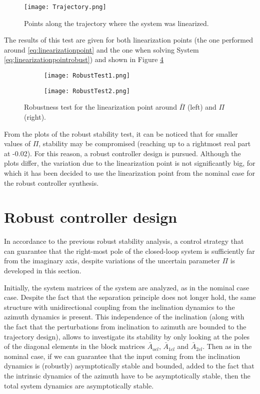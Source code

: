 \documentclass[../main.tex]{subfiles}
\begin{document}
 \begin{figure}[H]\centering
 	\texttt{[image: Trajectory.png]}
 	\caption{Points along the trajectory where the system was linearized.
 		\label{fig:Trajectory} }
 \end{figure}
 
 The results of this test are given for both linearization points (the one performed around \eqref{eq:linearizationpoint} and the one when solving System \eqref{eq:linearizationpointrobust}) and shown in Figure \ref{fig:RobustTest}
 
 \begin{figure}[ht]
 	\centering
 	\begin{subfigure}[b]{0.45\textwidth}
 		\texttt{[image: RobustTest1.png]}
 		\label{fig:RobustTest1}
 	\end{subfigure}
 	\begin{subfigure}[b]{0.45\textwidth}
 		\texttt{[image: RobustTest2.png]}
 		\label{fig:RobustTest2}
 	\end{subfigure}
 	\caption{\label{fig:RobustTest}Robustness test for the linearization point around $\bar{\Pi}$ (left) and $\Pi$ (right).}
 \end{figure} 
 
 From the plots of the robust stability test, it can be noticed that for smaller values of $\Pi$, stability may be compromised (reaching up to a rightmost real part at -0.02). For this reason, a robust controller design is pursued. Although the plots differ, the variation due to the linearization point is not significantly big, for which it has been decided to use the linearization point from the nominal case for the robust controller synthesis.
\newpage 
\section{Robust controller design}

In accordance to the previous robust stability analysis, a control strategy that can guarantee that the right-most pole of the closed-loop system is sufficiently far from the imaginary axis, despite variations of the uncertain parameter $\Pi$ is developed in this section.

Initially, the system matrices of the system are analyzed, as in the nominal case case. Despite the fact that the separation principle does not longer hold, the same structure with unidirectional coupling from the inclination dynamics to the azimuth dynamics is present. This independence of the inclination (along with the fact that the perturbations from inclination to azimuth are bounded to the trajectory design), allows to investigate its stability by only looking at the poles of the diagonal elements in the block matrices $\bar{A}_{ocl}$, $\bar{A}_{1cl}$ and $\bar{A}_{2cl}$. Then as in the nominal case, if we can guarantee that the input coming from the inclination dynamics is (robustly) asymptotically stable and bounded, added to the fact that the intrinsic dynamics of the azimuth have to be asymptotically stable, then the total system dynamics are asymptotically stable. 
\end{document}
